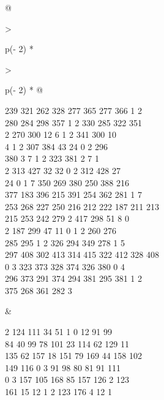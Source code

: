 \begin{question}
\begin{longtable}[]{@{}

  >{\raggedright\arraybackslash}p{(\columnwidth - 2\tabcolsep) * }

  >{\raggedright\arraybackslash}p{(\columnwidth - 2\tabcolsep) * }@{}}
\begin{minipage}[t]{\linewidth}
239 321 262 328 277 365 277 366 1 2\\

280 284 298 357 1 2 330 285 322 351\\

2 270 300 12 6 1 2 341 300 10\\

4 1 2 307 384 43 24 0 2 296\\

380 3 7 1 2 323 381 2 7 1\\

2 313 427 32 32 0 2 312 428 27\\

24 0 1 7 350 269 380 250 388 216\\

377 183 396 215 391 254 362 281 1 7\\

253 268 227 250 216 212 222 187 211 213\\

215 253 242 279 2 417 298 51 8 0\\

2 187 299 47 11 0 1 2 260 276\\

285 295 1 2 326 294 349 278 1 5\\

297 408 302 413 314 415 322 412 328 408\\

0 3 323 373 328 374 326 380 0 4\\

296 373 291 374 294 381 295 381 1 2\\

375 268 361 282 3\strut

\end{minipage} & \begin{minipage}[t]{\linewidth}\raggedright

2 124 111 34 51 1 0 12 91 99\\

84 40 99 78 101 23 114 62 129 11\\

135 62 157 18 151 79 169 44 158 102\\

149 116 0 3 91 98 80 81 91 111\\

0 3 157 105 168 85 157 126 2 123\\

161 15 12 1 2 123 176 4 12 1\\


\end{minipage}
\end{longtable}
\end{question}
